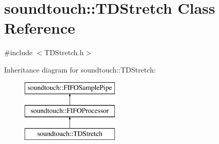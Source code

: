 \hypertarget{classsoundtouch_1_1_t_d_stretch}{}\section{soundtouch\+:\+:T\+D\+Stretch Class Reference}
\label{classsoundtouch_1_1_t_d_stretch}


{\ttfamily \#include $<$T\+D\+Stretch.\+h$>$}

Inheritance diagram for soundtouch\+:\+:T\+D\+Stretch\+:\begin{figure}[H]
\begin{center}
\leavevmode
\includegraphics[height=3.000000cm]{classsoundtouch_1_1_t_d_stretch}
\end{center}
\end{figure}
